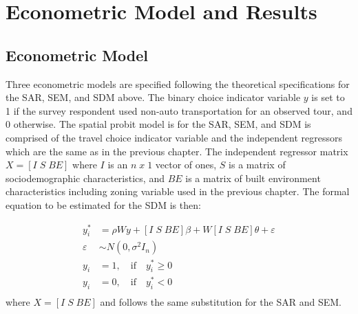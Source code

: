 \section{Econometric Model and Results}

\subsection{Econometric Model}
Three econometric models are specified following the theoretical specifications for the SAR, SEM, and SDM above.  The binary choice indicator variable $y$ is set to 1 if the survey respondent used non-auto transportation for an observed tour, and 0 otherwise.  The spatial probit model is for the SAR, SEM, and SDM is comprised of the travel choice indicator variable and the independent regressors which are the same as in the previous chapter.  The independent regressor matrix $X = [I \; S \; BE]$ where $I$ is an $n\; x\; 1$  vector of ones, $S$ is a matrix of sociodemographic characteristics, and $BE$ is a matrix of built environment characteristics including zoning variable used in the previous chapter.  The formal equation to be estimated for the SDM is then:

\begin{equation}
\begin{split}
y^{*}_{i} &= \rho W y + [I \; S \; BE]\beta + W[I \; S \; BE]\theta + \varepsilon \\
\varepsilon &\sim N(0, \sigma^{2}I_n) \\
y_i &= 1,\quad \text{if} \quad y^{*}_{i} \geq 0\\
y_i &= 0,\quad  \text{if} \quad  y^{*}_{i} < 0  \\
\end{split}
\end{equation}%
where $X =  [I \; S \; BE]$ and follows the same substitution for the SAR and SEM.
